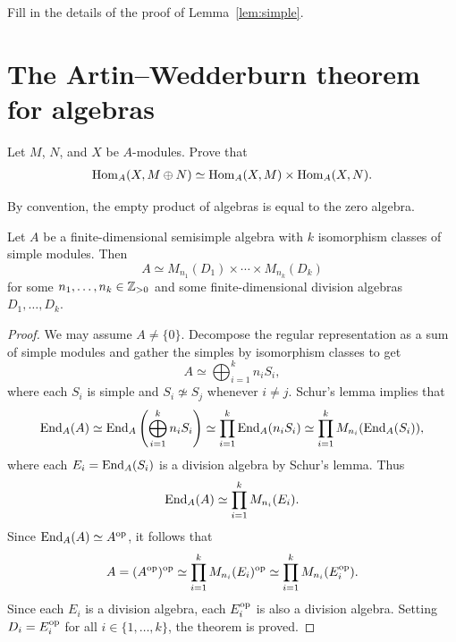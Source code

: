 \begin{exercise}
    Fill in the details of the proof of Lemma~\ref{lem:simple}.
\end{exercise}

\section{The Artin--Wedderburn theorem for algebras}

\begin{exercise}
    Let $M$, $N$, and $X$ be $A$-modules. Prove that 
    \begin{align*}
        \operatorname{Hom}_A(X,M\oplus N)\simeq\operatorname{Hom}_A(X,M)\times\operatorname{Hom}_A(X,N).
    \end{align*}
\end{exercise}

By convention, the empty product of algebras is equal to 
the zero algebra. 

\begin{theorem}
Let $A$ be a finite-dimensional semisimple algebra with  
$k$ isomorphism classes of simple modules. Then 
\[
A\simeq M_{n_1}(D_1)\times\cdots\times M_{n_k}(D_k)
\]
for some $n_1,\dots,n_k\in\mathbb{Z}_{>0}$ and some finite-dimensional 
division algebras $D_1,\dots,D_k$.
\end{theorem}

\begin{proof}
    We may assume $A\ne\{0\}$. 
    Decompose the regular representation as a sum of simple modules and
    gather the simples by isomorphism classes to get 	
    \[
	A\simeq\bigoplus_{i=1}^k n_iS_i,
	\]
	where each $S_i$ is simple and $S_i\not\simeq S_j$ whenever 
	$i\ne j$. Schur's lemma implies that  
	\begin{align*}
		\operatorname{End}_A(A)\simeq\operatorname{End}_A\left(\bigoplus_{i=1}^kn_iS_i\right)
		\simeq \prod_{i=1}^k\operatorname{End}_A(n_iS_i)
		\simeq\prod_{i=1}^kM_{n_i}(\operatorname{End}_A(S_i)), 
	\end{align*}
	where each $E_i=\operatorname{End}_A(S_i)$ is a division algebra by Schur's lemma. 
    Thus
    \[
		\operatorname{End}_A(A)\simeq\prod_{i=1}^kM_{n_i}(E_i).
	\]
	Since $\operatorname{End}_A(A)\simeq
	A^{\operatorname{op}}$, it follows that  
	\begin{align*}
		A=(A^{\operatorname{op}})^{\operatorname{op}}\simeq \prod_{i=1}^kM_{n_i}(E_i)^{\operatorname{op}}\simeq \prod_{i=1}^kM_{n_i}(E_i^{\operatorname{op}}).
	\end{align*}
  Since each $E_i$ is a division algebra, each $E_i^{\operatorname{op}}$ is also a division
  algebra. Setting $D_i=E_i^{\operatorname{op}}$ for all $i\in\{1,\dots,k\}$, the theorem 
  is proved. 
\end{proof}

